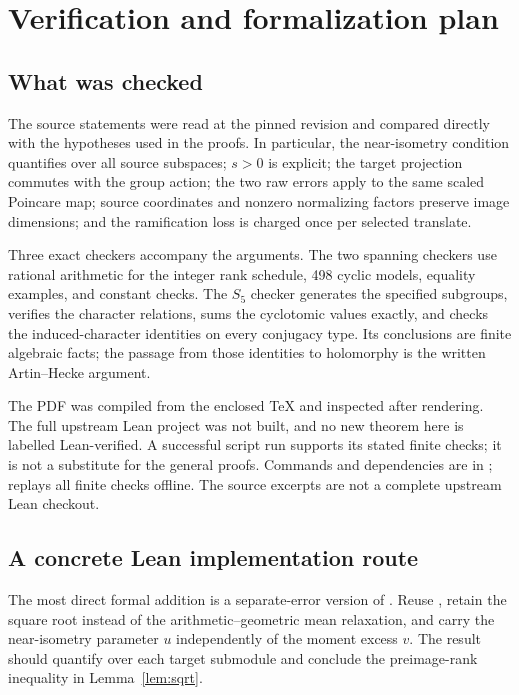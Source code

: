 \section{Verification and formalization plan}

\subsection{What was checked}

The source statements were read at the pinned revision and compared
directly with the hypotheses used in the proofs. In particular, the
near-isometry condition quantifies over all source subspaces; $s>0$ is
explicit; the target projection commutes with the group action; the two
raw errors apply to the same scaled Poincare map; source coordinates and
nonzero normalizing factors preserve image dimensions; and the
ramification loss is charged once per selected translate.

Three exact checkers accompany the arguments. The two
spanning checkers use rational arithmetic for the integer rank schedule,
498 cyclic models, equality examples, and constant checks. The $S_5$ checker generates the
specified subgroups, verifies the character relations, sums the
cyclotomic values exactly, and checks the induced-character identities
on every conjugacy type. Its conclusions are finite algebraic facts;
the passage from those identities to holomorphy is the written
Artin--Hecke argument.

The PDF was compiled from the enclosed TeX and inspected after rendering.
The full upstream Lean project was not built, and no new theorem here is
labelled Lean-verified. A successful script run supports its stated
finite checks; it is not a substitute for the general proofs.
Commands and dependencies are in ;
 replays all finite checks offline.
The source excerpts are not a complete upstream Lean checkout.

\subsection{A concrete Lean implementation route}

The most direct formal addition is a separate-error version of
. Reuse
, retain the square root
instead of the arithmetic--geometric mean relaxation, and carry the
near-isometry parameter $u$ independently of the moment excess $v$.
The result should quantify over each target submodule and conclude the
preimage-rank inequality in Lemma~\ref{lem:sqrt}.

